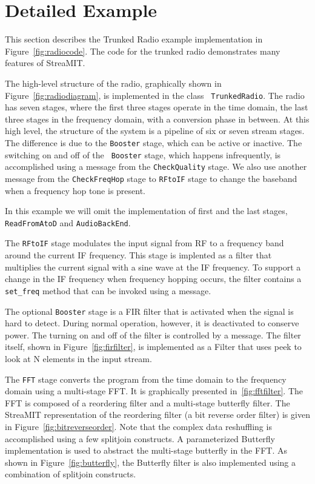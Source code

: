 \section{Detailed Example}
\label{sec:example}
This section describes the Trunked Radio example implementation in
Figure~\ref{fig:radiocode}. The code for the trunked radio
demonstrates many features of StreaMIT.

The high-level structure of the radio, graphically shown in
Figure~\ref{fig:radiodiagram}, is implemented in the class {\tt
TrunkedRadio}. The radio has seven stages, where the first three
stages operate in the time domain, the last three stages in the
frequency domain, with a conversion phase in between.  At this high
level, the structure of the system is a pipeline of six or seven
stream stages. The difference is due to the {\tt Booster} stage, which
can be active or inactive. The switching on and off of the {\tt
Booster} stage, which happens infrequently, is accomplished using a
message from the {\tt CheckQuality} stage. We also use another message
from the {\tt CheckFreqHop} stage to {\tt RFtoIF} stage to change the
baseband when a frequency hop tone is present.

In this example we will omit the implementation of first and the last
stages, {\tt ReadFromAtoD} and {\tt AudioBackEnd}.

The {\tt RFtoIF} stage modulates the input signal from RF to a
frequency band around the current IF frequency. This stage is
implented as a filter that multiplies the current signal with a sine
wave at the IF frequency.  To support a change in the IF frequency
when frequency hopping occurs, the filter contains a {\tt set\_freq}
method that can be invoked using a message.

The optional {\tt Booster} stage is a FIR filter that is activated
when the signal is hard to detect. During normal operation, however,
it is deactivated to conserve power. The turning on and off of the
filter is controlled by a message.  The filter itself, shown in
Figure~\ref{fig:firfilter}, is implemented as a Filter that uses peek
to look at N elements in the input stream.

The {\tt FFT} stage converts the program from the time domain to the
frequency domain using a multi-stage FFT. It is graphically presented
in~\ref{fig:fftfilter}. The FFT is composed of a reordering filter and
a multi-stage butterfly filter. The StreaMIT representation of the
reordering filter (a bit reverse order filter) is given in
Figure~\ref{fig:bitreverseorder}. Note that the complex data
reshuffling is accomplished using a few splitjoin constructs.  A
parameterized Butterfly implementation is used to abstract the
multi-stage butterfly in the FFT. As shown in
Figure~\ref{fig:butterfly}, the Butterfly filter is also implemented
using a combination of splitjoin constructs.

